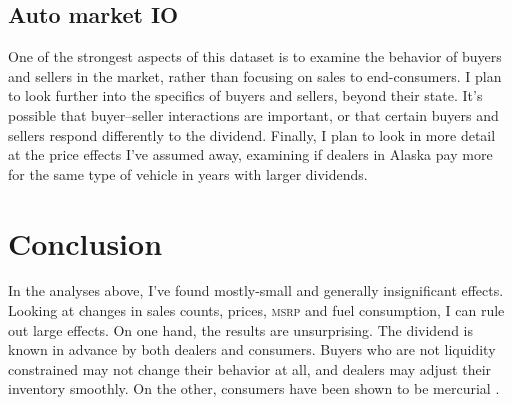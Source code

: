 \documentclass[11pt,letterpaper,oneside]{article}
\newcommand{\msrp}{\textsc{msrp}}
\newcommand{\vin}{\textsc{vin}}
\begin{document}
\begin{doublespacing}
\subsection{Auto market IO}
One of the strongest aspects of this dataset is to examine the behavior of buyers and sellers in the market, rather than focusing on sales to end-consumers.
I plan to look further into the specifics of buyers and sellers, beyond their state.
It's possible that buyer--seller interactions are important, or that certain buyers and sellers respond differently to the dividend.
Finally, I plan to look in more detail at the price effects I've assumed away, examining if dealers in Alaska pay more for the same type of vehicle in years with larger dividends.
%
%


\section{Conclusion}

In the analyses above, I've found mostly\hyp{}small and generally insignificant effects.
Looking at changes in sales counts, prices, \msrp{} and fuel consumption, I can rule out large effects.
On one hand,  the results are unsurprising.
The dividend is known in advance by both dealers and consumers.
Buyers who are not liquidity constrained may not change their behavior at all, and dealers may adjust their inventory smoothly.
On the other, consumers have been shown to be mercurial \parencite{Busse2015_weather_on_cars}.

%
%


\end{doublespacing}
\end{document}
